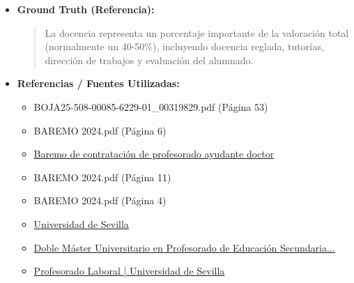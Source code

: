 \documentclass[12pt,a4paper,oneside]{report}
\begin{document}
\begin{itemize}
\begin{itemize}
\begin{quote}
La comisión de contratación valorará estos criterios para determinar la idoneidad de los candidatos para la plaza de Profesor Ayudante Doctor.
                \end{quote}
          \item \textbf{{Ground Truth (Referencia):}} \\
                \begin{quote}
La docencia representa un porcentaje importante de la valoración total (normalmente un 40-50\%), incluyendo docencia reglada, tutorías, dirección de trabajos y evaluación del alumnado.
                \end{quote}
          \item \textbf{{Referencias / Fuentes Utilizadas:}} \\
                \begin{itemize}
                  \item BOJA25-508-00085-6229-01\_00319829.pdf (Página 53)
                  \item BAREMO 2024.pdf (Página 6)
                  \item \href{https://departamento.us.es/destoma/images/baremo\_contratacion\_profesorado.pdf}{Baremo de contratación de profesorado ayudante doctor}
                  \item BAREMO 2024.pdf (Página 11)
                  \item BAREMO 2024.pdf (Página 4)
                  \item \href{https://docentes.us.es/index.php?page=pdi/empleo\_publico\_ajax&etiqueta=Profesorado+Ayudante+Doctor+LOSU}{Universidad de Sevilla}
                  \item \href{https://www.us.es/estudiar/que-estudiar/oferta-de-masteres/doble-master-universitario-en-profesorado-de-educacion}{Doble Máster Universitario en Profesorado de Educación Secundaria...}
                  \item \href{https://www.us.es/trabaja-en-la-us/profesorado/planificacion-y-seleccion/profesorado-laboral}{Profesorado Laboral | Universidad de Sevilla}
                \end{itemize}
        \end{itemize}


\end{itemize}
\end{document}
